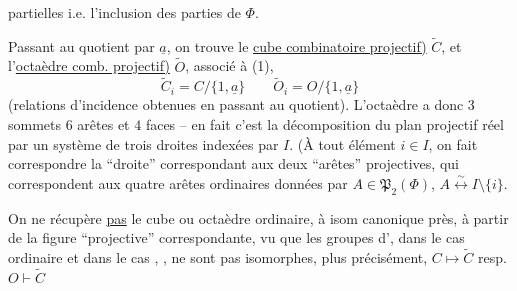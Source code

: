 partielles i.e. l'inclusion des parties de $\Phi$.

Passant au quotient par $\underline a$, on trouve le \uline{cube combinatoire  projectif)} $\widetilde C$, et l'\uline{octaèdre comb.  projectif)} $\widetilde O$, associé à (1),
\[
\widetilde C_i=C/\{1,\underline a\}\qquad
\widetilde O_i=O/\{1,\underline a\}\tag*{(4)}
\]
(relations d'incidence obtenues en passant au quotient). L'octaèdre   a donc $3$ sommets $6$ arêtes et $4$ faces -- en fait c'est la décomposition du plan projectif réel par un système de trois droites indexées par $I$. (À tout élément $i\in I$, on fait correspondre la ``droite'' correspondant aux deux ``arêtes'' projectives, qui correspondent aux quatre arêtes ordinaires données par $A\in\mathfrak P_2(\Phi)$,
$A\overset{\sim}{\longleftrightarrow}I\setminus\{i\}$.

On ne récupère \uline{pas} le cube ou octaèdre ordinaire, à isom canonique près, à partir de la figure  ``projective'' correspondante, vu que les groupes d', dans le cas ordinaire et dans le cas , , ne sont pas isomorphes, plus précisément, $C\mapsto\widetilde C$ resp. $O\vdash\widetilde{C}$
